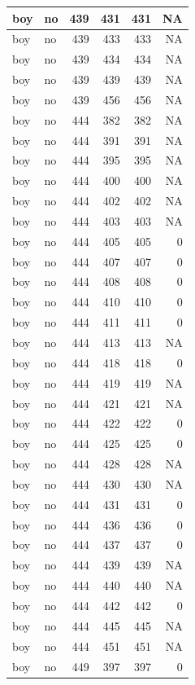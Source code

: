 \documentclass[man]{apa6}
\begin{document}
\begin{tabular}{l|l|r|r|r|r}
\hline
boy & no & 439 & 431 & 431 & NA\\
\hline
boy & no & 439 & 433 & 433 & NA\\
\hline
boy & no & 439 & 434 & 434 & NA\\
\hline
boy & no & 439 & 439 & 439 & NA\\
\hline
boy & no & 439 & 456 & 456 & NA\\
\hline
boy & no & 444 & 382 & 382 & NA\\
\hline
boy & no & 444 & 391 & 391 & NA\\
\hline
boy & no & 444 & 395 & 395 & NA\\
\hline
boy & no & 444 & 400 & 400 & NA\\
\hline
boy & no & 444 & 402 & 402 & NA\\
\hline
boy & no & 444 & 403 & 403 & NA\\
\hline
boy & no & 444 & 405 & 405 & 0\\
\hline
boy & no & 444 & 407 & 407 & 0\\
\hline
boy & no & 444 & 408 & 408 & 0\\
\hline
boy & no & 444 & 410 & 410 & 0\\
\hline
boy & no & 444 & 411 & 411 & 0\\
\hline
boy & no & 444 & 413 & 413 & NA\\
\hline
boy & no & 444 & 418 & 418 & 0\\
\hline
boy & no & 444 & 419 & 419 & NA\\
\hline
boy & no & 444 & 421 & 421 & NA\\
\hline
boy & no & 444 & 422 & 422 & 0\\
\hline
boy & no & 444 & 425 & 425 & 0\\
\hline
boy & no & 444 & 428 & 428 & NA\\
\hline
boy & no & 444 & 430 & 430 & NA\\
\hline
boy & no & 444 & 431 & 431 & 0\\
\hline
boy & no & 444 & 436 & 436 & 0\\
\hline
boy & no & 444 & 437 & 437 & 0\\
\hline
boy & no & 444 & 439 & 439 & NA\\
\hline
boy & no & 444 & 440 & 440 & NA\\
\hline
boy & no & 444 & 442 & 442 & 0\\
\hline
boy & no & 444 & 445 & 445 & NA\\
\hline
boy & no & 444 & 451 & 451 & NA\\
\hline
boy & no & 449 & 397 & 397 & 0\\

\end{tabular}
\end{document}
